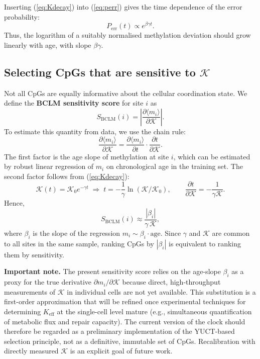 \documentclass[12pt,a4paper]{article}
\newcommand{\REL}{\mathcal{K}}          %
\begin{document}
	Inserting (\ref{eq:Kdecay}) into (\ref{eq:perr}) gives the time dependence of the error probability:
	\[
	P_{\mathrm{err}}(t) \propto e^{\beta\gamma t}.
	\]
	Thus, the logarithm of a suitably normalised methylation deviation should grow linearly with age, with slope \(\beta\gamma\).
	
	\subsection{Selecting CpGs that are sensitive to \(\REL\)}
	Not all CpGs are equally informative about the cellular coordination state. We define the \textbf{BCLM sensitivity score} for site \(i\) as
	\begin{equation}
		S_{\mathrm{BCLM}}(i) = \left| \frac{\partial \langle m_i \rangle}{\partial \REL} \right|.
		\label{eq:sensitivity}
	\end{equation}
	To estimate this quantity from data, we use the chain rule:
	\[
	\frac{\partial \langle m_i \rangle}{\partial \REL} = \frac{\partial \langle m_i \rangle}{\partial t} \cdot \frac{\partial t}{\partial \REL}.
	\]
	The first factor is the age slope of methylation at site \(i\), which can be estimated by robust linear regression of \(m_i\) on chronological age in the training set. The second factor follows from (\ref{eq:Kdecay}):
	\[
	\REL(t) = \REL_0 e^{-\gamma t} \;\Longrightarrow\; t = -\frac{1}{\gamma}\ln(\REL/\REL_0),\qquad
	\frac{\partial t}{\partial \REL} = -\frac{1}{\gamma \REL}.
	\]
	Hence,
	\[
	S_{\mathrm{BCLM}}(i) \approx \frac{|\beta_i|}{\gamma \, \REL},
	\]
	where \(\beta_i\) is the slope of the regression \(m_i \sim \beta_i \cdot \text{age}\). Since \(\gamma\) and \(\REL\) are common to all sites in the same sample, ranking CpGs by \(|\beta_i|\) is equivalent to ranking them by sensitivity.
	
	\textbf{Important note.}
	The present sensitivity score relies on the age-slope \(\beta_i\) as a proxy for the true derivative \(\partial m_i/\partial \REL\) because direct, high-throughput measurements of \(\REL\) in individual cells are not yet available.
	This substitution is a first-order approximation that will be refined once experimental techniques for determining \(K_{\mathrm{eff}}\) at the single-cell level mature (e.g., simultaneous quantification of metabolic flux and repair capacity).
	The current version of the clock should therefore be regarded as a preliminary implementation of the YUCT-based selection principle, not as a definitive, immutable set of CpGs.
	Recalibration with directly measured \(\REL\) is an explicit goal of future work.
	
\end{document}
